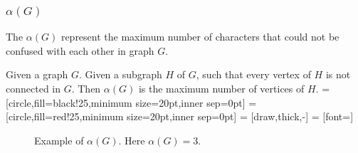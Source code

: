\documentclass{beamer}
\begin{document}
                  \begin{frame}
                        \frametitle{$\alpha(G)$}
                        \begin{definition}[$\alpha(G)$]\label{def:alpha}
                              The $\alpha(G)$ represent the maximum number of characters that could not be confused with each other in graph $G$.

                              \pause

                              Given a graph $ G $. Given a subgraph $ H $ of $ G $, such that every vertex of $ H $ is not connected in $ G $. Then $ \alpha(G) $ is the maximum number of vertices of $ H $.
                              =[circle,fill=black!25,minimum size=20pt,inner sep=0pt]
                              =[circle,fill=red!25,minimum size=20pt,inner sep=0pt]
                               = [draw,thick,-]
                               = [font=\small]
                              \begin{figure}[h!]
                                    \label{fig:alphaGExample}
                                    \caption{Example of $ \alpha(G) $. Here $ \alpha(G) = 3 $.}
                              \end{figure}
                        \end{definition}
                  \end{frame}
\end{document}
